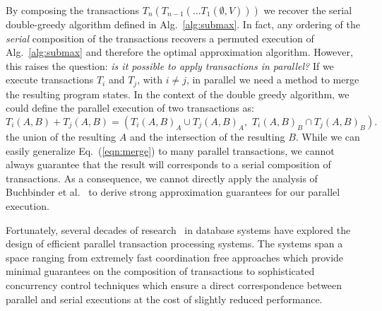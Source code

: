 \documentclass{article} %
\newcommand{\eg}{{\em e.g.,}~}
\newcommand{\eqnref}[1]{Eq.~(\ref{#1})}
\newcommand{\algref}[1]{Alg.~\ref{#1}}
\newcommand{\union}{\cup}
\newcommand{\inter}{\cap}
\begin{document}
By composing the transactions $T_n (T_{n-1}(\ldots T_1(\emptyset, V)))$ we recover the serial double-greedy algorithm defined in \algref{alg:submax}.
In fact, any ordering of the \emph{serial} composition of the transactions recovers a permuted execution of \algref{alg:submax} and therefore the optimal approximation algorithm.
However, this raises the question: \emph{is it possible to apply transactions in parallel?}
If we execute transactions $T_i$ and $T_j$, with $i \neq j$, in parallel we
need a method to merge the resulting program states.
In the context of the double greedy algorithm, we could define the parallel execution of two transactions as:
\begin{equation}
T_i(A,B) + T_j(A,B) = \left(T_i(A,B)_A \union T_j(A,B)_A,  \,\, T_i(A,B)_B  \inter T_j(A,B)_B \right).
\label{eqn:merge}
\end{equation}
the union of the resulting $A$ and the intersection of the resulting $B$.
While we can easily generalize \eqnref{eqn:merge} to many parallel transactions, we cannot always guarantee that the result will corresponds to a serial composition of transactions.
As a consequence, we cannot directly apply the analysis of Buchbinder et al.~\cite{buchbinder2012} to derive strong approximation guarantees for our parallel execution.

Fortunately, several decades of research~\citep{Ozsu07,kung1981:occ} in database systems have explored the design of efficient parallel transaction processing systems.
The systems span a space ranging from extremely fast coordination free approaches which provide minimal guarantees on the composition of transactions to sophisticated concurrency control techniques which ensure a direct correspondence between parallel and serial executions at the cost of slightly reduced performance.




\end{document}
